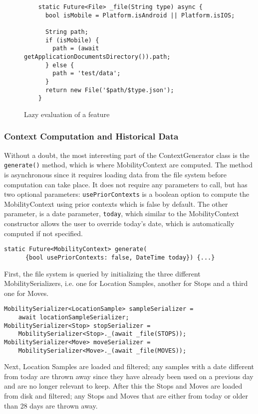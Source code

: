 \begin{figure}
    \centering
    \begin{verbatim}
    static Future<File> _file(String type) async {
      bool isMobile = Platform.isAndroid || Platform.isIOS;
    
      String path;
      if (isMobile) {
        path = (await getApplicationDocumentsDirectory()).path;
      } else {
        path = 'test/data';
      }
      return new File('$path/$type.json');
    }
    \end{verbatim}
    \caption{Lazy evaluation of a feature}
    \label{fig:lazy-evaluation}
\end{figure}

\subsubsection{Context Computation and Historical Data}
Without a doubt, the most interesting part of the ContextGenerator class is the \verb|generate()| method, which is where MobilityContext are computed. The method is asynchronous since it requires loading data from the file system before computation can take place. It does not require any parameters to call, but has two optional parameters: \verb|usePriorContexts| is a boolean option to compute the MobilityContext using prior contexts which is false by default. The other parameter, is a date parameter, \verb|today|, which similar to the MobilityContext constructor allows the user to override today's date, which is automatically computed if not specified.

\begin{verbatim}
static Future<MobilityContext> generate(
      {bool usePriorContexts: false, DateTime today}) {...}
\end{verbatim}

First, the file system is queried by initializing the three different MobilitySerializers, i.e. one for Location Samples, another for Stops and a third one for Moves. 
\begin{verbatim}
MobilitySerializer<LocationSample> sampleSerializer =
    await locationSampleSerializer;
MobilitySerializer<Stop> stopSerializer =
    MobilitySerializer<Stop>._(await _file(STOPS));
MobilitySerializer<Move> moveSerializer =
    MobilitySerializer<Move>._(await _file(MOVES));
\end{verbatim}

Next, Location Samples are loaded and filtered; any samples with a date different from today are thrown away since they have already been used on a previous day and are no longer relevant to keep. After this the Stops and Moves are loaded from disk and filtered; any Stops and Moves that are either from today or older than 28 days are thrown away.

